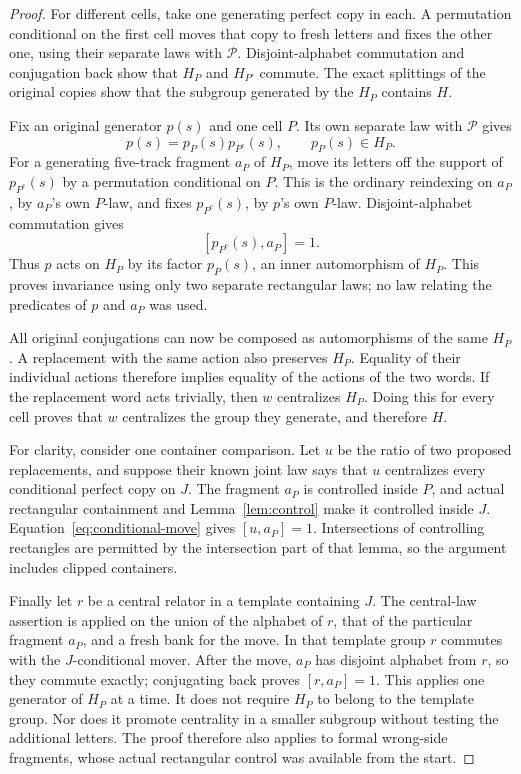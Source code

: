 \begin{proof}
For different cells, take one generating perfect copy
in each.  A permutation conditional on the first cell
moves that copy to fresh letters and fixes the other
one, using their separate laws with $\mathcal P$.
Disjoint-alphabet commutation and conjugation back show
that $H_P$ and $H_{P'}$ commute.  The exact splittings
of the original copies show that the subgroup generated by the
$H_P$ contains $H$.

Fix an original generator $p(s)$ and one cell $P$.
Its own separate law with $\mathcal P$ gives
\begin{equation}\label{eq:cell-invariance-split}
 p(s)=p_P(s)p_{P^c}(s),\qquad p_P(s)\in H_P.
\end{equation}
For a generating five-track fragment $a_P$ of $H_P$,
move its letters off the support of $p_{P^c}(s)$ by a
permutation conditional on $P$.  This is the ordinary
reindexing on $a_P$, by $a_P$'s own $P$-law, and fixes
$p_{P^c}(s)$, by $p$'s own $P$-law.  Disjoint-alphabet
commutation gives
\begin{equation}\label{eq:cell-complement-commutes}
 [p_{P^c}(s),a_P]=1.
\end{equation}
Thus $p$ acts on $H_P$ by its factor $p_P(s)$, an inner
automorphism of $H_P$.  This proves invariance using
only two separate rectangular laws; no law relating
the predicates of $p$ and $a_P$ was used.

All original conjugations can now be composed as
automorphisms of the same $H_P$.  A replacement with
the same action also preserves $H_P$.  Equality of
their individual actions therefore implies equality
of the actions of the two words.  If the replacement
word acts trivially, then $w$ centralizes $H_P$.
Doing this for every cell proves that $w$ centralizes
the group they generate, and therefore $H$.

For clarity, consider one container comparison.
Let $u$ be the ratio of two proposed replacements,
and suppose their known joint law says that $u$
centralizes every conditional perfect copy on $J$.
The fragment $a_P$ is controlled inside $P$, and
actual rectangular containment and
Lemma~\ref{lem:control} make it controlled inside
$J$.  Equation~\eqref{eq:conditional-move} gives
$[u,a_P]=1$.  Intersections of controlling rectangles
are permitted by the intersection part of that
lemma, so the argument includes clipped containers.

Finally let $r$ be a central relator in a template
containing $J$.  The central-law assertion is applied
on the union of the alphabet of $r$, that of the
particular fragment $a_P$, and a fresh bank for the
move.  In that template group $r$ commutes with the
$J$-conditional mover.  After the move, $a_P$ has
disjoint alphabet from $r$, so they commute exactly;
conjugating back proves $[r,a_P]=1$.  This applies
one generator of $H_P$ at a time.  It does not require
$H_P$ to belong to the template group.  Nor does it
promote centrality in a smaller subgroup without
testing the additional letters.  The proof therefore
also applies to formal wrong-side fragments, whose
actual rectangular control was available from the
start.
\end{proof}

